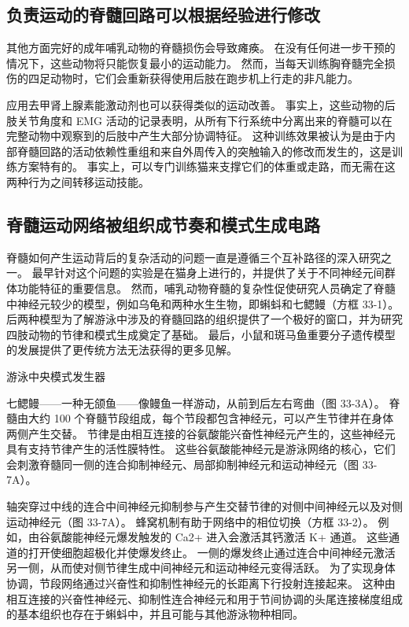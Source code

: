 \subsection{负责运动的脊髓回路可以根据经验进行修改}
其他方面完好的成年哺乳动物的脊髓损伤会导致瘫痪。 在没有任何进一步干预的情况下，这些动物将只能恢复最小的运动能力。 然而，当每天训练胸脊髓完全损伤的四足动物时，它们会重新获得使用后肢在跑步机上行走的非凡能力。

应用去甲肾上腺素能激动剂也可以获得类似的运动改善。 事实上，这些动物的后肢关节角度和 EMG 活动的记录表明，从所有下行系统中分离出来的脊髓可以在完整动物中观察到的后肢中产生大部分协调特征。 这种训练效果被认为是由于内部脊髓回路的活动依赖性重组和来自外周传入的突触输入的修改而发生的，这是训练方案特有的。 事实上，可以专门训练猫来支撑它们的体重或走路，而无需在这两种行为之间转移运动技能。




\subsection{脊髓运动网络被组织成节奏和模式生成电路}

脊髓如何产生运动背后的复杂活动的问题一直是遵循三个互补路径的深入研究之一。 最早针对这个问题的实验是在猫身上进行的，并提供了关于不同神经元间群体功能特征的重要信息。 然而，哺乳动物脊髓的复杂性促使研究人员确定了脊髓中神经元较少的模型，例如乌龟和两种水生生物，即蝌蚪和七鳃鳗（方框 33-1）。 后两种模型为了解游泳中涉及的脊髓回路的组织提供了一个极好的窗口，并为研究四肢动物的节律和模式生成奠定了基础。 最后，小鼠和斑马鱼重要分子遗传模型的发展提供了更传统方法无法获得的更多见解。

游泳中央模式发生器

七鳃鳗——一种无颌鱼——像鳗鱼一样游动，从前到后左右弯曲（图 33-3A）。 脊髓由大约 100 个脊髓节段组成，每个节段都包含神经元，可以产生节律并在身体两侧产生交替。 节律是由相互连接的谷氨酸能兴奋性神经元产生的，这些神经元具有支持节律产生的活性膜特性。 这些谷氨酸能神经元是游泳网络的核心，它们会刺激脊髓同一侧的连合抑制神经元、局部抑制神经元和运动神经元（图 33-7A）。

轴突穿过中线的连合中间神经元抑制参与产生交替节律的对侧中间神经元以及对侧运动神经元（图 33-7A）。 蜂窝机制有助于网络中的相位切换（方框 33-2）。 例如，由谷氨酸能神经元爆发触发的 Ca2+ 进入会激活其钙激活 K+ 通道。 这些通道的打开使细胞超极化并使爆发终止。 一侧的爆发终止通过连合中间神经元激活另一侧，从而使对侧节律生成中间神经元和运动神经元变得活跃。 为了实现身体协调，节段网络通过兴奋性和抑制性神经元的长距离下行投射连接起来。 这种由相互连接的兴奋性神经元、抑制性连合神经元和用于节间协调的头尾连接梯度组成的基本组织也存在于蝌蚪中，并且可能与其他游泳物种相同。

